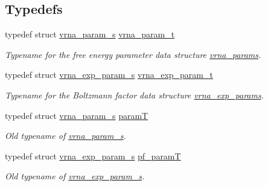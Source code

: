 \subsection*{Typedefs}
\begin{DoxyCompactItemize}
\item 
typedef struct \hyperlink{group__energy__parameters_structvrna__param__s}{vrna\+\_\+param\+\_\+s} \hyperlink{group__energy__parameters_ga8a69ca7d787e4fd6079914f5343a1f35}{vrna\+\_\+param\+\_\+t}\hypertarget{group__energy__parameters_ga8a69ca7d787e4fd6079914f5343a1f35}{}\label{group__energy__parameters_ga8a69ca7d787e4fd6079914f5343a1f35}

\begin{DoxyCompactList}\small\item\em Typename for the free energy parameter data structure \hyperlink{group__energy__parameters_gad0e3e7e74bdc50d1709d40c92993185e}{vrna\+\_\+params}. \end{DoxyCompactList}\item 
typedef struct \hyperlink{group__energy__parameters_structvrna__exp__param__s}{vrna\+\_\+exp\+\_\+param\+\_\+s} \hyperlink{group__energy__parameters_ga01d8b92fe734df8d79a6169482c7d8d8}{vrna\+\_\+exp\+\_\+param\+\_\+t}\hypertarget{group__energy__parameters_ga01d8b92fe734df8d79a6169482c7d8d8}{}\label{group__energy__parameters_ga01d8b92fe734df8d79a6169482c7d8d8}

\begin{DoxyCompactList}\small\item\em Typename for the Boltzmann factor data structure \hyperlink{group__energy__parameters_gab1f3016f96aa96bff020cdd904605afa}{vrna\+\_\+exp\+\_\+params}. \end{DoxyCompactList}\item 
typedef struct \hyperlink{group__energy__parameters_structvrna__param__s}{vrna\+\_\+param\+\_\+s} \hyperlink{group__energy__parameters_ga857dde86357d306cc902f0d8b2797659}{paramT}
\begin{DoxyCompactList}\small\item\em Old typename of \hyperlink{group__energy__parameters_structvrna__param__s}{vrna\+\_\+param\+\_\+s}. \end{DoxyCompactList}\item 
typedef struct \hyperlink{group__energy__parameters_structvrna__exp__param__s}{vrna\+\_\+exp\+\_\+param\+\_\+s} \hyperlink{group__energy__parameters_ga8bffe1828e2cbec101769f5cc0b1535b}{pf\+\_\+paramT}
\begin{DoxyCompactList}\small\item\em Old typename of \hyperlink{group__energy__parameters_structvrna__exp__param__s}{vrna\+\_\+exp\+\_\+param\+\_\+s}. \end{DoxyCompactList}\end{DoxyCompactItemize}
